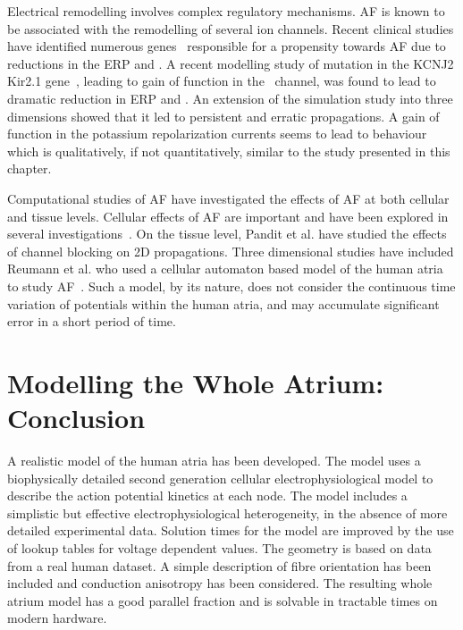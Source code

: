 Electrical remodelling involves complex regulatory mechanisms.
AF is known to be associated with the remodelling of several ion channels.
Recent clinical studies have identified numerous
genes~\cite{Otway2007,Xia2005,Yang2004,Restier2008,Hong2005,Ravens2008,Yang1997a,Olson2005a} responsible for a
propensity towards AF due to reductions in the ERP and \apd.
A recent modelling study of mutation in the KCNJ2 Kir2.1 gene~\cite{Kharche2008}, leading to gain
of function in the \ channel, was found to lead to dramatic reduction in
ERP and \apd.
An extension of the simulation study into three dimensions showed that it led to
persistent and erratic propagations.
A gain of function in the potassium repolarization currents seems to lead to
behaviour which is qualitatively, if not quantitatively, similar to the study
presented in this chapter.

Computational studies of AF have investigated the effects of AF at both cellular
and tissue levels.
Cellular effects of AF are important and have been explored in several
investigations~\cite{Zhang2005,Workman2001,Bosch2003}.
On the tissue level, Pandit et al. have studied the effects of channel blocking
on 2D propagations\cite{Pandit2005}.
Three dimensional studies have included Reumann et al. who used a cellular
automaton based model of the human atria to study AF~\cite{Reumann2007}.
Such a model, by its nature, does not consider the continuous time variation of
potentials within the human atria, and may accumulate significant error in a
short period of time.





\section{Modelling the Whole Atrium: Conclusion}

A realistic model of the human atria has been developed.
The model uses a biophysically detailed second generation cellular
electrophysiological model to describe the action potential kinetics at each node.
The model includes a simplistic but effective electrophysiological
heterogeneity, in the absence of more detailed experimental data.
Solution times for the model are improved by the use of lookup tables for
voltage dependent values.
The geometry is based on data from a real human dataset.
A simple description of fibre orientation has been included and conduction
anisotropy has been considered.
The resulting whole atrium model has a good parallel fraction and is solvable in
tractable times on modern hardware.

